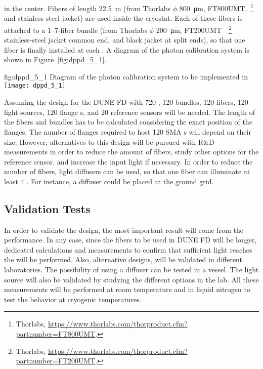 in the center. Fibers of length \SI{22.5}{m} (from Thorlabs $\phi$ \SI{800}{\micro\meter}, FT800UMT,~\footnote{Thorlabs\texttrademark{}, \url{https://www.thorlabs.com/thorproduct.cfm?partnumber=FT800UMT}.} %
 and stainless-steel jacket) are used inside the cryostat. Each of these fibers is attached to a \numrange{1}{7}-fiber bundle (from Thorlabs $\phi$ \SI{200}{\micro\meter}, FT200UMT~~\footnote{Thorlabs\texttrademark{}, \url{https://www.thorlabs.com/thorproduct.cfm?partnumber=FT200UMT}.} %
 stainless-steel jacket common end, and black jacket at split ends), so that one fiber is finally installed at each . A diagram of the  photon calibration system is shown in Figure~\ref{fig:dppd_5_1}. %

\begin{dunefigure}{fig:dppd_5_1}
{Diagram of the photon calibration system to be implemented in }
\texttt{[image: dppd\_5\_1]}
\end{dunefigure}

Assuming the  design for the DUNE FD with \num{720} , \num{120} bundles, \num{120} fibers, \num{120} light sources, \num{120} flange \fdth{}s, and \num{20} reference sensors will be needed. The length of the fibers and bundles has to be calculated considering the exact position of the \fdth flanges. The number of flanges required to host \num{120} SMA \fdth{}s will depend on their size. However, alternatives to this design will be pursued with R\&D measurements in order to reduce the amount of fibers, study other options for the reference sensor, and increase the input light if necessary. In order to reduce the number of fibers, light diffusers can be used, so that one fiber can illuminate at least \num{4} . For instance, a diffuser could be placed at the ground grid. 

\subsection{Validation Tests}
\label{sec:fddp-pd-5.2}

In order to validate the design, the most important result will come from the  performance. In any case, since the fibers to be used in DUNE FD will be longer, dedicated calculations and measurements to confirm that sufficient light reaches the  will be performed. Also, alternative designs, will be validated in different laboratories. The possibility of using a diffuser can be tested in a vessel. The light source will also be validated by studying the different options in the lab. All these measurements will be performed at room temperature and in liquid nitrogen to test the behavior at cryogenic temperatures.

